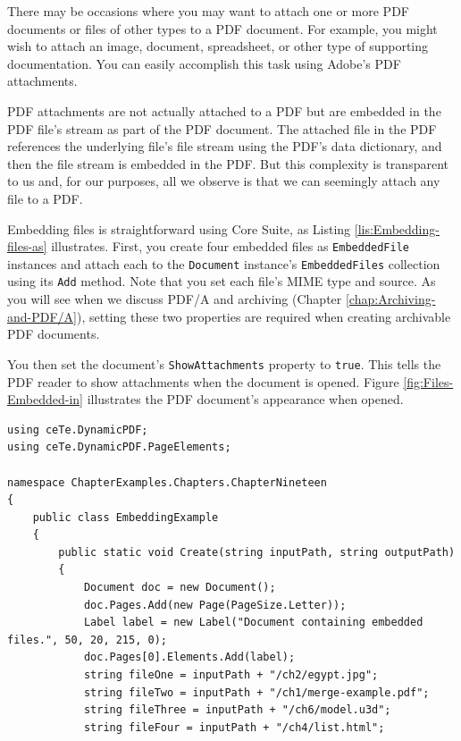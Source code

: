 \documentclass[american]{tufte-book}
\numberwithin{equation}{section}
\numberwithin{figure}{section}
\begin{document}
{{There may be occasions where you may want to attach one or more PDF
documents or files of other types to a PDF document. For example,
you might wish to attach an image, document, spreadsheet, or other
type of supporting documentation. You can easily accomplish this task
using Adobe's PDF attachments. 

PDF attachments are not actually attached to a PDF
but are embedded in the PDF file’s stream as part of the PDF document.
The \textquotedbl attached file\textquotedbl{} in the PDF references
the underlying file’s file stream using the PDF’s data dictionary,
and then the file stream is embedded in the PDF. But this complexity
is transparent to us and, for our purposes, all we observe is that
we can seemingly attach any file to a PDF.

Embedding files is straightforward using Core Suite, as Listing \ref{lis:Embedding-files-as}
illustrates. First, you create four embedded files as \texttt{EmbeddedFile}
instances and attach each to the \texttt{Document} instance's
\texttt{EmbeddedFiles} collection using its \texttt{Add} method. Note
that you set each file's MIME type and source. As you will see when
we discuss PDF/A and archiving (Chapter \ref{chap:Archiving-and-PDF/A}),
setting these two properties are required when creating archivable
PDF documents. 

You then set the document's \texttt{ShowAttachments} property to \texttt{true}.
This tells the PDF reader to show attachments when the document is
opened. Figure \ref{fig:Files-Embedded-in} illustrates the PDF document's
appearance when opened.

\bgroup{}
\begin{lstlisting}[caption={Embedding files as attachments.},label={lis:Embedding-files-as},basicstyle={\footnotesize\ttfamily},breaklines=true,showstringspaces=false]
using ceTe.DynamicPDF;
using ceTe.DynamicPDF.PageElements;

namespace ChapterExamples.Chapters.ChapterNineteen
{
    public class EmbeddingExample
    {
        public static void Create(string inputPath, string outputPath)
        {
            Document doc = new Document();
            doc.Pages.Add(new Page(PageSize.Letter));
            Label label = new Label("Document containing embedded files.", 50, 20, 215, 0);
            doc.Pages[0].Elements.Add(label);
            string fileOne = inputPath + "/ch2/egypt.jpg";
            string fileTwo = inputPath + "/ch1/merge-example.pdf";
            string fileThree = inputPath + "/ch6/model.u3d";
            string fileFour = inputPath + "/ch4/list.html";


\end{lstlisting}}}
\end{document}
